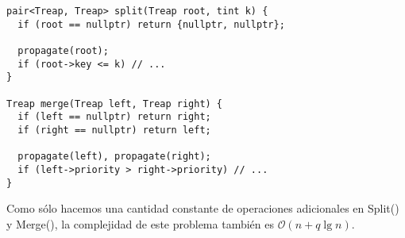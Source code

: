 \begin{verbatim}
pair<Treap, Treap> split(Treap root, tint k) {
  if (root == nullptr) return {nullptr, nullptr};

  propagate(root);
  if (root->key <= k) // ...
}

Treap merge(Treap left, Treap right) {
  if (left == nullptr) return right;
  if (right == nullptr) return left;

  propagate(left), propagate(right);
  if (left->priority > right->priority) // ...
}
\end{verbatim}

Como sólo hacemos una cantidad constante de operaciones adicionales en Split() y Merge(), la complejidad de este problema también es \(\mathcal{O}(n + q \lg n)\).
